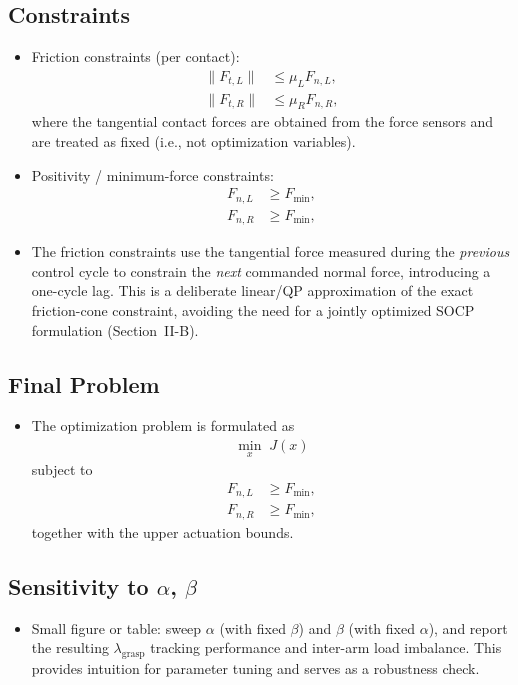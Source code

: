 \documentclass[conference]{IEEEtran}
\begin{document}
\subsection{Constraints}
\begin{itemize}
    \item Friction constraints (per contact):
    \begin{align}
        \lVert F_{t,L} \rVert
        &\le
        \mu_{L}F_{n,L}, \\
        \lVert F_{t,R} \rVert
        &\le
        \mu_{R}F_{n,R},
    \end{align}
    where the tangential contact forces are obtained from the force sensors and are treated as fixed (i.e., not optimization variables).

    \item Positivity / minimum-force constraints:
    \begin{align}
        F_{n,L}&\geq F_{\mathrm{min}}, \\
        F_{n,R}&\geq F_{\mathrm{min}},
    \end{align}

    \item The friction constraints use the tangential force measured during the \emph{previous} control cycle to constrain the \emph{next} commanded normal force, introducing a one-cycle lag. This is a deliberate linear/QP approximation of the exact friction-cone constraint, avoiding the need for a jointly optimized SOCP formulation (Section~II-B).
\end{itemize}


\subsection{Final Problem}
\begin{itemize}
    \item The optimization problem is formulated as
    \begin{align}
        \min_{x}\; J(x)
    \end{align}
    subject to
    \begin{align}
        F_{n,L}
        &\ge
        F_{\mathrm{min}}, \\
        F_{n,R}
        &\ge
        F_{\mathrm{min}},
    \end{align}
    together with the upper actuation bounds.

   
\end{itemize}

\subsection{Sensitivity to $\alpha$, $\beta$}
\begin{itemize}
    \item Small figure or table: sweep \(\alpha\) (with fixed \(\beta\)) and \(\beta\) (with fixed \(\alpha\)), and report the resulting \(\lambda_{\mathrm{grasp}}\) tracking performance and inter-arm load imbalance. This provides intuition for parameter tuning and serves as a robustness check.
\end{itemize}
\end{document}
